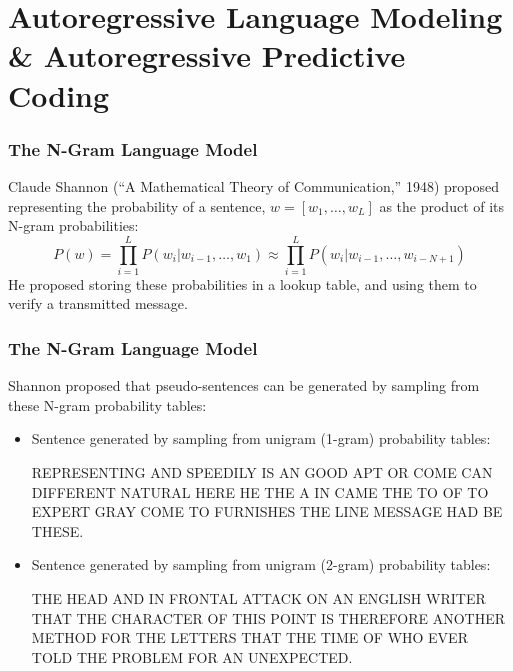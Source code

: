 \documentclass{beamer}
\begin{document}
\section[APC]{Autoregressive Language Modeling \& Autoregressive Predictive Coding}
\setcounter{subsection}{1}

\begin{frame}
  \frametitle{The N-Gram Language Model}

  Claude Shannon (``A Mathematical Theory of Communication,'' 1948)
  proposed representing the probability of a sentence,
  $w=[w_1,\ldots,w_L]$ as the product of its N-gram probabilities:
  \begin{displaymath}
    P(w) = \prod_{i=1}^L P(w_i|w_{i-1},\ldots,w_1)
    \approx\prod_{i=1}^L P(w_i|w_{i-1},\ldots,w_{i-N+1})
  \end{displaymath}
  He proposed storing these probabilities in a lookup table, and using
  them to verify a transmitted message.
\end{frame}

\begin{frame}
  \frametitle{The N-Gram Language Model}

  Shannon proposed that pseudo-sentences can be generated by sampling
  from these N-gram probability tables:
  \begin{itemize}
  \item Sentence generated by sampling from unigram (1-gram) probability tables:
    \begin{center}
      REPRESENTING AND SPEEDILY IS AN GOOD APT OR COME CAN DIFFERENT NATURAL
      HERE HE THE A IN CAME THE TO OF TO EXPERT GRAY COME TO FURNISHES
      THE LINE MESSAGE HAD BE THESE.
    \end{center}
  \item Sentence generated by sampling from unigram (2-gram) probability tables:
    \begin{center}
      THE HEAD AND IN FRONTAL ATTACK ON AN ENGLISH WRITER THAT THE CHARACTER
      OF THIS POINT IS THEREFORE ANOTHER METHOD FOR THE LETTERS THAT
      THE TIME OF WHO EVER TOLD THE PROBLEM FOR AN UNEXPECTED.
    \end{center}
  \end{itemize}
\end{frame}
\end{document}
